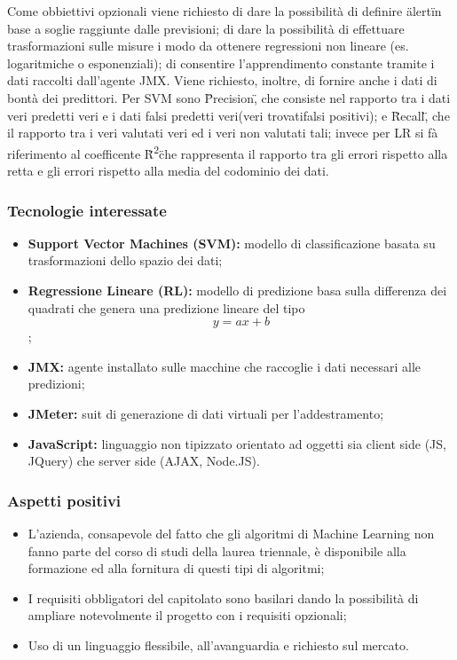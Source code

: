 			Come obbiettivi opzionali viene richiesto di dare la possibilità di definire \"alert\" in base a soglie raggiunte dalle previsioni; di dare la possibilità di effettuare trasformazioni sulle misure i modo da ottenere regressioni non lineare (es. logaritmiche o esponenziali); di consentire l'apprendimento constante tramite i dati raccolti dall'agente JMX. Viene richiesto, inoltre,  di fornire anche i dati di bontà dei predittori. Per SVM sono \"Precision\", che consiste nel rapporto tra i dati veri predetti veri e i dati falsi predetti veri(veri trovati\/falsi positivi); e \"Recall\", che il rapporto tra i veri valutati veri ed i veri non valutati tali; invece per LR si fà riferimento al coefficente \"R\textsuperscript{2}\" che rappresenta il rapporto tra gli errori rispetto alla retta e gli errori rispetto alla media del codominio dei dati.


		\subsubsection{Tecnologie interessate}
			\begin{itemize}
			  \item \textbf{Support Vector Machines (SVM):} modello di classificazione basata su trasformazioni dello spazio dei dati;
			  \item \textbf{Regressione Lineare (RL):} modello di predizione basa sulla differenza dei quadrati che genera una predizione lineare del tipo \[y=ax+b\];
				\item \textbf{JMX:} agente installato sulle macchine che raccoglie i dati necessari alle predizioni;
				\item \textbf{JMeter:} suit di generazione di dati virtuali per l'addestramento;
			  \item \textbf{JavaScript:} linguaggio non tipizzato orientato ad oggetti sia client side (JS, JQuery) che server side (AJAX, Node.JS).
			\end{itemize}

		\subsubsection{Aspetti positivi}
			\begin{itemize}
			  \item L’azienda, consapevole del fatto che gli algoritmi di Machine Learning non fanno parte del corso di studi della laurea triennale, è disponibile alla formazione ed alla fornitura di questi tipi di algoritmi;
			  \item I requisiti obbligatori del capitolato sono basilari dando la possibilità di ampliare notevolmente il progetto con i requisiti opzionali;
			  \item Uso di un linguaggio flessibile, all'avanguardia e richiesto sul mercato.
			\end{itemize}

